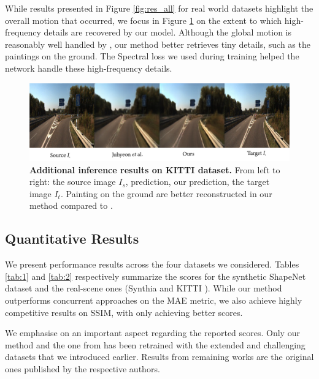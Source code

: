 While results presented in Figure \ref{fig:res_all} for real world datasets highlight the overall motion that occurred, we focus in Figure \ref{fig:res_all2} on the extent to which high-frequency details are recovered by our model. Although the global motion is reasonably well handled by \citep{kim2020novel}, our method better retrieves tiny details, such as the paintings on the ground. The Spectral loss we used during training helped the network handle these high-frequency details. 

\begin{figure}[h!]
    \begin{center}
    \includegraphics[width=\textwidth]{images/epipolarnvs/rebbutal_KITTI_3_New.png}
    \end{center}
     \caption{\textbf{Additional inference results on KITTI dataset.} From left to right: the source image  $I_s$, \citep{kim2020novel} prediction, our prediction, the target image $I_t$. Painting on the ground are better reconstructed in our method compared to \citep{kim2020novel}.}
     \label{fig:res_all2}
\end{figure}

  
\subsection{Quantitative Results}

We present performance results across the four datasets we considered. Tables \ref{tab:1} and \ref{tab:2} respectively summarize the scores for the synthetic ShapeNet \citep{chang2015shapenet} dataset and the real-scene ones (Synthia \citep{ros2016synthia} and KITTI \citep{geiger2012we}). While our method outperforms concurrent approaches on the \ac{MAE} metric, we also achieve highly competitive results on \ac{SSIM}, with only \citep{sun2018multiview} achieving better scores. \newline

We emphasise on an important aspect regarding the reported scores. Only our method and the one from \citep{kim2020novel} has been retrained with the extended and challenging datasets that we introduced earlier. Results from remaining works \citep{tatarchenko2015single,zhou2016view,park2017transformation,sun2018multiview,} are the original ones published by the respective authors. 

